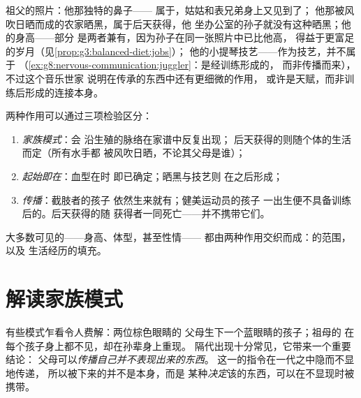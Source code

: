 \begin{example}[给家庭相册分类]\label{ex:g9:heredity-and-traits:album}
祖父的照片：他那独特的鼻子——
属于，姑姑和表兄弟身上又见到了；
他那被风吹日晒而成的农家晒黑，属于后天获得，他
坐办公室的孙子就没有这种晒黑；他的身高——部分
是两者兼有，因为孙子在同一张照片中已比他高，
得益于更富足的岁月（见\cref{prop:g3:balanced-diet:jobs}）；
他的小提琴技艺——作为技艺，并不属于
（\cref{ex:g8:nervous-communication:juggler}：是经训练形成的，
而非传播而来），不过这个音乐世家
说明在传承的东西中还有更细微的作用，
或许是天赋，而非训练后形成的连接本身。
\end{example}

\begin{proposition}[遗传的与后天获得的]\label{prop:g9:heredity-and-traits:sorting}
两种作用可以通过三项检验区分：
\begin{enumerate}
  \item \emph{家族模式}：会
        沿生殖的脉络在家谱中反复出现；
        后天获得的则随个体的生活而定（所有水手都
        被风吹日晒，不论其父母是谁）；
  \item \emph{起始即在}：血型在时
        即已确定；晒黑与技艺则
        在之后形成；
  \item \emph{传播}：截肢者的孩子
        依然生来就有；健美运动员的孩子
        一出生便不具备训练后的。后天获得的随
        获得者一同死亡——并不携带它们。
\end{enumerate}
大多数可见的——身高、体型，甚至性情——
都由两种作用交织而成：的范围，以及
生活经历的填充。
\end{proposition}
\admitted

\section{解读家族模式}

\begin{example}[隔代出现的性状]\label{ex:g9:heredity-and-traits:skip}
有些模式乍看令人费解：两位棕色眼睛的
父母生下一个蓝眼睛的孩子；祖母的
在每个孩子身上都不见，却在孙辈身上重现。
隔代出现十分常见，它带来一个重要结论：
父母可以\emph{传播自己并不表现出来的东西}。
这一的指令在一代之中隐而不显地传递，
所以被下来的并不是本身，而是
某种\emph{决定}该的东西，可以在不显现时被携带。
\end{example}

